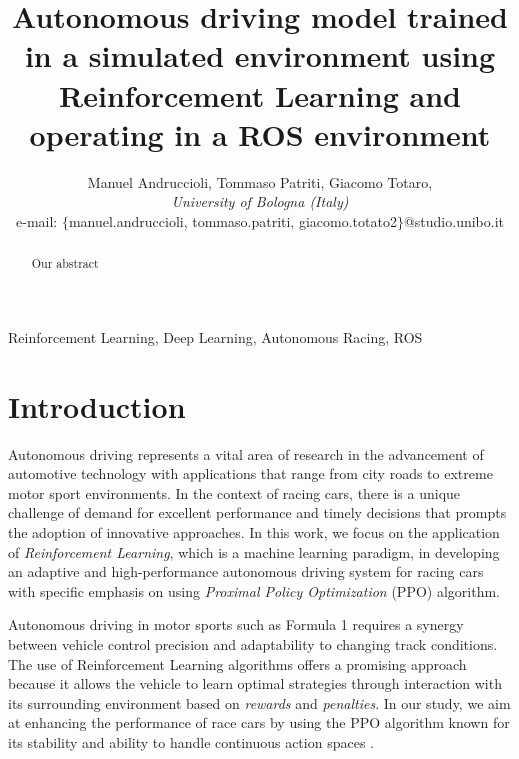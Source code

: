 \documentclass[conference]{IEEEtran}
\begin{document}
\title{
    Autonomous driving model trained in a simulated environment using Reinforcement Learning and operating in a ROS environment
}

\author{Manuel Andruccioli,
Tommaso Patriti,
Giacomo Totaro,\\ 
\textit{University of Bologna (Italy)} \\
e-mail: $\{$manuel.andruccioli, tommaso.patriti, giacomo.totato2$\}$@studio.unibo.it }

\maketitle

\begin{abstract}
Our abstract
\end{abstract}

\begin{IEEEkeywords}
    Reinforcement Learning, Deep Learning, Autonomous Racing, ROS
\end{IEEEkeywords}

\section{Introduction}




Autonomous driving represents a vital area of research in the advancement of automotive technology with applications that range from city roads to extreme motor sport environments.
%
In the context of racing cars, there is a unique challenge of demand for excellent performance and timely decisions that prompts the adoption of innovative approaches.
%
In this work, we focus on the application of \emph{Reinforcement Learning}, which is a machine learning paradigm, in developing an adaptive and high-performance autonomous driving system for racing cars with specific emphasis on using \emph{Proximal Policy Optimization} (PPO) algorithm.

Autonomous driving in motor sports such as Formula 1 requires a synergy between vehicle control precision and adaptability to changing track conditions.
%
The use of Reinforcement Learning algorithms offers a promising approach because it allows the vehicle to learn optimal strategies through interaction with its surrounding environment based on \emph{rewards} and \emph{penalties}.
%
In our study, we aim at enhancing the performance of race cars by using the PPO algorithm known for its stability and ability to handle continuous action spaces \cite{PPOOpenAI}.
\end{document}
